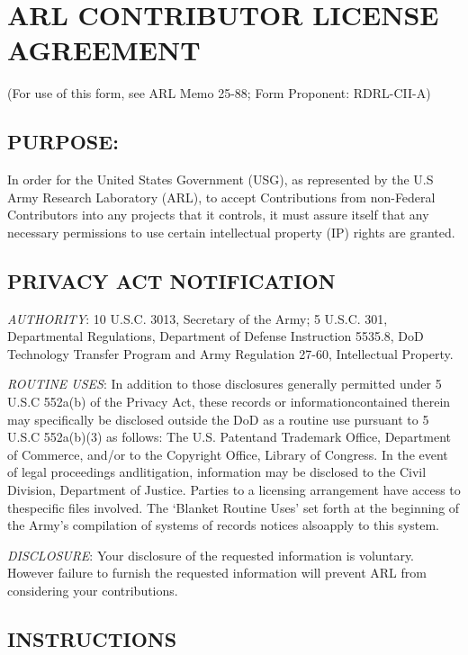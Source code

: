 \section{ARL CONTRIBUTOR LICENSE
AGREEMENT}\label{arl-contributor-license-agreement}

(For use of this form, see ARL Memo 25-88; Form Proponent: RDRL-CII-A)

\subsection{PURPOSE:}\label{purpose}

In order for the United States Government (USG), as represented by the
U.S Army Research Laboratory (ARL), to accept Contributions from
non-Federal Contributors into any projects that it controls, it must
assure itself that any necessary permissions to use certain intellectual
property (IP) rights are granted.

\subsection{PRIVACY ACT NOTIFICATION}\label{privacy-act-notification}

\emph{AUTHORITY}: 10 U.S.C. 3013, Secretary of the Army; 5 U.S.C. 301,
Departmental Regulations, Department of Defense Instruction 5535.8, DoD
Technology Transfer Program and Army Regulation 27-60, Intellectual
Property.

\emph{ROUTINE USES}: In addition to those disclosures generally
permitted under 5 U.S.C 552a(b) of the Privacy Act, these records or
informationcontained therein may specifically be disclosed outside the
DoD as a routine use pursuant to 5 U.S.C 552a(b)(3) as follows: The U.S.
Patentand Trademark Office, Department of Commerce, and/or to the
Copyright Office, Library of Congress. In the event of legal proceedings
andlitigation, information may be disclosed to the Civil Division,
Department of Justice. Parties to a licensing arrangement have access to
thespecific files involved. The `Blanket Routine Uses' set forth at the
beginning of the Army's compilation of systems of records notices
alsoapply to this system.

\emph{DISCLOSURE}: Your disclosure of the requested information is
voluntary. However failure to furnish the requested information will
prevent ARL from considering your contributions.

\subsection{INSTRUCTIONS}\label{instructions}

